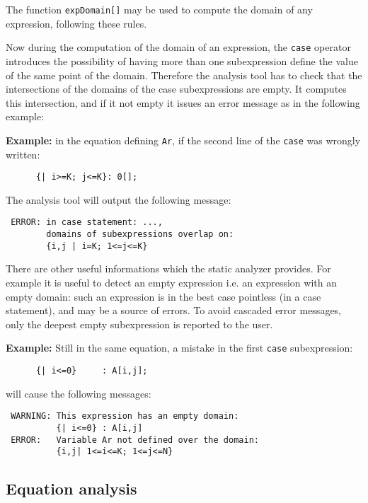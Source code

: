 The function \texttt{expDomain[]}  may be used to
compute the domain of any {\alfa} expression, following these rules.

Now during the computation of the domain of an expression, the
\texttt{case} operator  introduces the possibility of
having more than one subexpression define the value of the same point
of the domain.  Therefore the analysis tool has to check that the
intersections of the domains of the case subexpressions are empty. It
computes this intersection, and if it not empty it issues an error
message as in the following example:

\textbf{Example:} in the equation defining \texttt{Ar}, if the
second line of the \texttt{case} was wrongly written:
\begin{verbatim}
      {| i>=K; j<=K}: 0[];
\end{verbatim}
The analysis tool will output the following message:
\begin{verbatim}
 ERROR: in case statement: ...,
        domains of subexpressions overlap on:
        {i,j | i=K; 1<=j<=K}
\end{verbatim}


There are other useful informations which the static analyzer
provides. For example it is useful to detect an empty expression
i.e. an expression with an empty domain: such an expression is 
in the best case pointless (in a case statement), and may be a source of
errors. 
To avoid cascaded error messages, only the
deepest empty subexpression is reported to the user.

\textbf{Example:}
 Still in the same equation, a mistake in the first \texttt{case} subexpression:
\begin{verbatim}
      {| i<=0}     : A[i,j];
\end{verbatim}
will cause the following messages:
\begin{verbatim}
 WARNING: This expression has an empty domain: 
          {| i<=0} : A[i,j]
 ERROR:   Variable Ar not defined over the domain: 
          {i,j| 1<=i<=K; 1<=j<=N}
\end{verbatim}



\subsection{Equation analysis\label{equ_check}}

